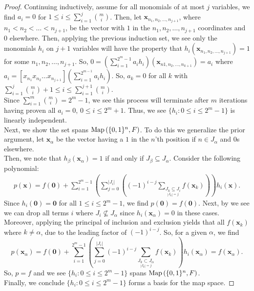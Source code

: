 \begin{proof}
	Continuing inductively, assume for all monomials of at most \(j\) variables, we find \(a_{i} = 0\) for \(1 \le i \le \sum_{i= 1}^{j} \binom{m}{i}\). Then, let \(\textbf{x}_{n_1, n_2, \ldots, n_{j+1}}\), where \(n_1 < n_2 < \ldots < n_{j+1}\), be the vector with \(1\) in the \(n_1, n_2, \ldots, n_{j+1}\) coordinates and \(0\) elsewhere. Then, applying the previous induction set, we see only the monomials \(h_{i}\) on \(j+1\) variables will have the property that \(h_{i} \left( \textbf{x}_{n_1, n_2, \ldots, n_{j+1}} \right) = 1 \) for some \(n_1, n_2, \ldots, n_{j+1}\). So, \(0 = \left( \sum_{i= 1}^{2^{m}-1} a_{i}h_{i} \right) \left( \textbf{x}_{n1, n_2, \ldots, n_{k+1}} \right)  = a_{i}\) where \(a_{i} = \left[ x_{n_1}x_{n_2} \ldots x_{n_{j+1}} \right] \left( \sum_{i= 1}^{2^{m-1}} a_{i}h_{i} \right) \). So, \(a_{k} = 0\) for all \(k\) with \(\sum_{i= 1}^{j} \binom{m}{i} + 1 \le i \le \sum_{i= 1}^{j+1} \binom{m}{i} \).\\
	Since \(\sum_{i= 1}^{m} \binom{m}{i} = 2^{m}-1\), we see this process will terminate after \(m\) iterations having proven all \(a_{i} = 0\), \(0 \le i \le 2^{m}+1\). Thus, we see \(\{h_{i} : 0 \le i \le 2^{m}-1\} \) is linearly independent.\\
	Next, we show the set spans \(\operatorname{Map}\left( \{0, 1\} ^{n}, F \right) \). To do this we generalize the prior argument, let \(\textbf{x}_{\alpha}\) be the vector having a \(1\) in the \(n\)'th position if \(n \in J_{\alpha}\) and \(0\)s elsewhere.\\
	Then, we note that \(h_{\beta} \left( \textbf{x}_{\alpha} \right) = 1 \) if and only if \(J_{\beta} \subseteq J_{\alpha}\). Consider the following polynomial:
	\begin{align*}
		p\left( \textbf{x} \right) = f\left( \textbf{0} \right)  + \sum_{i= 1}^{2^{m}-1} \left( \sum_{j=0}^{\left| J_{i} \right| } \left( \left( -1 \right) ^{i-j} \sum_{\underset{\left| J_{k} \right| = j}{J_{k} \subseteq J_{i}}}f\left( \textbf{x}_{k} \right)\right)  \right) h_{i}\left( \textbf{x} \right)
	.\end{align*}
	Since \(h_{i} \left( \textbf{0} \right)  = \textbf{0}\) for all \(1 \le i\le 2^{m}-1\), we find \(p\left( \textbf{0} \right) = f\left( \textbf{0} \right)  \). Next, by we see we can drop all terms \(i\) where \(J_{i} \nsubseteq J_{\alpha}\) since \(h_{i}\left( \textbf{x}_{\alpha} \right)= 0 \) in these cases. Moreover, applying the principal of inclusion and exclusion yields that all \(f\left( \textbf{x}_{k} \right) \) where \(k \neq \alpha\), due to the leading factor of \(\left( -1 \right) ^{i-j}\). So, for a given \(\alpha\), we find \[
		p\left( \textbf{x}_{\alpha} \right)= f\left( \textbf{0} \right)  + \sum_{i= 1}^{2^{m}-1} \left( \sum_{j=0}^{\left| J_{i} \right| } \left( -1 \right)^{i-j} \sum_{\underset{\left| J_{k} \right| = j}{J_{k} \subset J_{\alpha}}}^{} f\left( \textbf{x}_{k} \right)   \right) h_{i}\left( \textbf{x}_{\alpha} \right) = f\left( \textbf{x}_{\alpha} \right)
	.\]
	So, \(p = f\) and we see \(\{h_{i} : 0 \le i \le 2^{m}-1\} \) spans \(\operatorname{Map}\left( \{0, 1\} ^{n}, F \right) \).\\
	Finally, we conclude \(\{h_{i} : 0 \le i \le 2^{m}-1\} \) forms a basis for the map space.
\end{proof}
